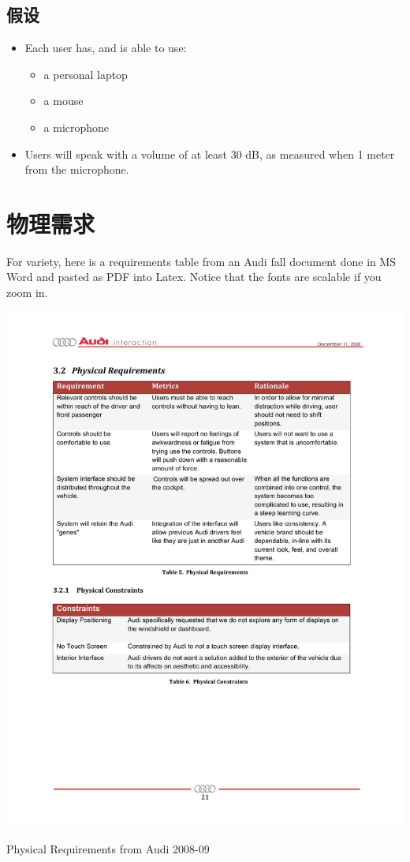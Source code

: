\subsection{假设}
\begin{itemize}\tightlist
\item Each user has, and is able to use:
\begin{itemize}\tightlist 
\item a personal laptop
\item a mouse
\item a microphone
\end{itemize}
\item Users will speak with a volume of at least 30 dB, as measured when 1 meter from the microphone.
\end{itemize}

\section{物理需求}
\label{sec:physicalreqs}

\color{blue}
For variety, here is a requirements table from an Audi fall document \cite{Audi2009Fall} done in MS Word and pasted as PDF into Latex. Notice that the fonts are scalable if you zoom in.
\normalcolor

\begin{table}[h]
        \centering
                \includegraphics[width=\textwidth]{Figures/Ch3/Audi08PhysReqs.pdf}
        \caption{Physical Requirements from Audi 2008-09}
        \label{tab:physical-requirements}
\end{table}


